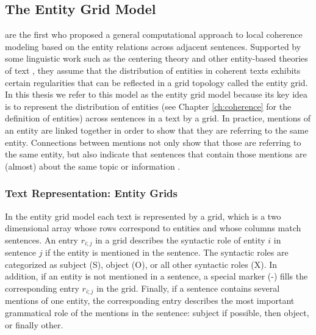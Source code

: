 \subsection{The Entity Grid Model}
\label{sec:rel-ent-grid} 

 are the first who proposed a general  computational approach to local coherence modeling based on the entity relations across adjacent sentences.  
Supported by some linguistic work such as the centering theory \cite{grosz95} and other entity-based theories of text \cite{prince81a}, they assume that the distribution of entities in coherent texts exhibits certain regularities that can be reflected in a grid topology called the entity grid. 
In this thesis we refer to this model as the entity grid model because its key idea is to represent the distribution of entities (see Chapter \ref{ch:coherence} for the definition of entities) across sentences in a text by a grid.   
In practice, mentions of an entity are linked together in order to show that they are referring to the same entity. 
Connections between mentions not only show that those are referring to the same entity, but also indicate that sentences that contain those mentions are (almost) about the same topic or information \cite{barzilay08}. 

\subsubsection{Text Representation: Entity Grids}

In the entity grid model each text is represented by a grid, which is a two dimensional array whose rows correspond to entities and whose columns match sentences.
An entry $r_{i;j}$ in a grid describes the syntactic role of entity $i$ in sentence $j$ if the entity is mentioned in the sentence. 
The syntactic roles are categorized as subject (S), object (O), or all other syntactic roles (X). 
In addition, if an entity is not mentioned in a sentence, a special marker (-) fills the corresponding entry $r_{i;j}$ in the grid. 
Finally, if a sentence contains several mentions of one entity, the corresponding entry describes the most important grammatical role of the mentions in the sentence: subject if possible, then object, or finally other. 

